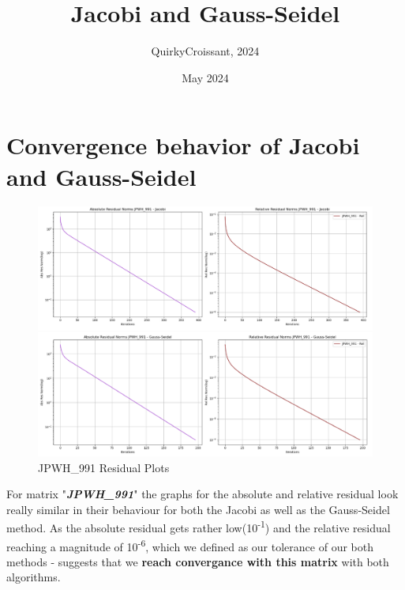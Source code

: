 \documentclass{article}
\title{Jacobi and Gauss-Seidel}
\author{QuirkyCroissant, 2024}
\date{May 2024}
\begin{document}
\maketitle

\section*{Convergence behavior of Jacobi and Gauss-Seidel}

\begin{figure}[h!]
    \centering
    \includegraphics[width=1\linewidth]{jpwh_991_res_plot.PNG}
    \caption{JPWH\_991 Residual Plots}
\end{figure}
    For matrix "\textit{\textbf{JPWH\_991}}" the graphs for the absolute and relative residual look really similar in their behaviour for both the Jacobi as well as the Gauss-Seidel method. As the absolute residual gets rather low(10\textsuperscript{-1}) and the relative residual reaching a magnitude of 10\textsuperscript{-6}, which we defined as our tolerance of our both methods - suggests that we \textbf{reach convergance with this matrix} with both algorithms.
    
\end{document}
